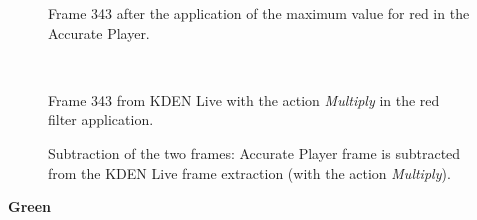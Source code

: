 \documentclass[../MasterThesis.tex]{subfiles}
\begin{document}
\vspace*{-1em}


\begin{minipage}{0.48\textwidth}
	\begin{figure}[H]
		\begin{center}
			\caption[]{Frame 343 after the application of the maximum value for red in the Accurate Player.}
		\end{center}
	\end{figure}
\end{minipage}\begin{minipage}{0.04\textwidth}
	\ 
\end{minipage}\begin{minipage}{0.48\textwidth}
	\begin{figure}[H]
		\begin{center}
			\caption[]{Frame 343 from KDEN Live with the action \textit{Multiply} in the red filter application.}
		\end{center}
	\end{figure}
\end{minipage}

\vspace*{-1em}

\begin{figure}[H]
	\begin{center}
		\caption[]{Subtraction of the two frames: Accurate Player frame is subtracted from the KDEN Live frame extraction (with the action \textit{Multiply}).}
	\end{center}
\end{figure}




\vspace*{-1em}
\textbf{Green}

\vspace*{-1em}
\end{document}
